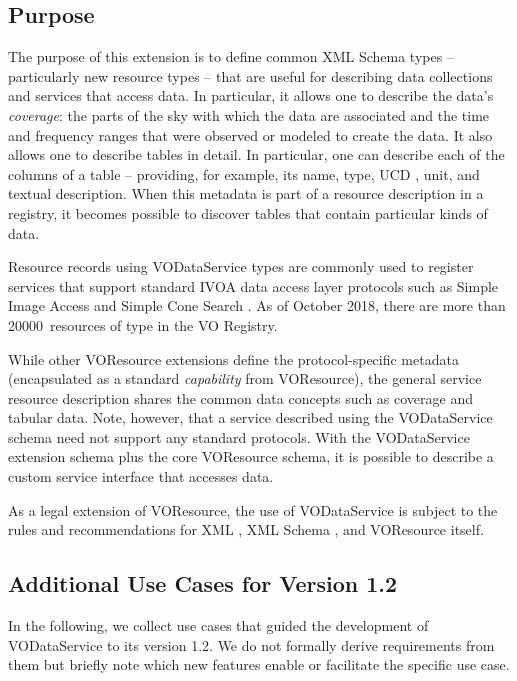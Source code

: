 \documentclass[11pt,a4paper]{ivoa}
\begin{document}
\subsection{Purpose}


The purpose of this extension is to define common XML Schema
types -- particularly new resource types -- that are useful for describing
data collections and services that access data.  In particular, it
allows one to describe the data's \emph{coverage}:  the parts of the
sky with which the data are associated and the time and frequency ranges that
were observed or modeled to create the data.  It also allows one to
describe tables in detail.  In particular, one can describe each of
the columns of a table -- providing, for example, its name, type, UCD
\citep{2005ivoa.spec.1231D}, unit,
and textual description.  When this metadata is part of a resource
description in a registry, it becomes possible
to discover tables that contain particular kinds of data.  



Resource records using VODataService types are commonly used to register
services that support standard IVOA data access layer protocols such
as Simple Image Access \citep{2015ivoa.spec.1223D} and Simple Cone Search
\citep{2008ivoa.specQ0222P}.  As of October 2018, there are more than
20000~resources of type  in the VO Registry.

While other VOResource extensions 
define the protocol-specific metadata (encapsulated as a standard
\emph{capability} from VOResource), the general service
resource description shares the common data concepts such as
coverage and tabular data.  Note, however, that a service described
using the VODataService schema need not support any standard
protocols.  With the VODataService extension schema plus the core
VOResource schema, it is possible to describe a custom service
interface that accesses data.  



As a legal extension of VOResource, the use
of VODataService is subject to the rules and recommendations for XML
\citep{std:XML}, XML Schema \citep{std:XSD},
and VOResource itself.  

\subsection{Additional Use Cases for Version 1.2}

In the following, we collect use cases that guided the development of
VODataService to its version 1.2.  We do not formally derive
requirements from them but briefly note which new features enable or
facilitate the specific use case.
\end{document}
